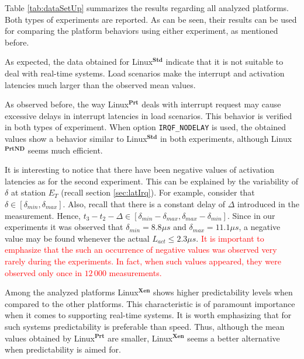 \documentclass{acm_proc_article-sp}
\newcommand{\col}[1]{\textcolor{red}{#1}}
\newcommand{\cod}[1]{\hspace{0.1cm}\texttt{#1}}
\begin{document}
Table \ref{tab:dataSetUp} summarizes the results regarding all analyzed platforms.
Both types of experiments are reported. As can be seen, their results can be used
for comparing the platform behaviors using either experiment, as mentioned before.

As expected, the data obtained for Linux$^\mathbf{Std}$ indicate that it is not
suitable to deal with real-time systems. Load scenarios make the interrupt and
activation latencies much larger than the observed mean values.

As observed before, the way Linux$^\mathbf{Prt}$ deals with interrupt request may
cause excessive delays in interrupt latencies in load scenarios. This behavior is
verified in both types of experiment. When option \cod{IRQF\_NODELAY} is used, the
obtained values show a behavior similar to Linux$^\mathbf{Std}$ in both experiments,
although Linux$^\mathbf{PrtND}$ seems much efficient.

It is interesting to notice that there have been negative values of activation
latencies as for the second experiment.  This can be explained by the variability of
$\delta$ at station $E_T$ (recall section \ref{sec:latIrq}).  For example, consider
that $\delta \in [\delta_{min},\delta_{max}]$. Also, recall that there is a constant
delay of $\Delta$ introduced in the measurement. Hence, $t_3 - t_2 - \Delta \in
[\delta_{min}-\delta_{max},\delta_{max}-\delta_{min}]$. Since in our experiments it
was observed that $\delta_{min} = 8.8 \mu s$ and $\delta_{max} = 11.1 \mu s$, a
negative value may be found whenever the actual $L_{act} \leq 2.3 \mu s$. \col{It is
important to emphasize that the such an occurrence of negative values was observed
very rarely during the experiments. In fact, when such values appeared, they were
observed only once in $12\,000$ measurements.}

Among the analyzed platforms Linux$^\mathbf{Xen}$ shows higher predictability levels
when compared to the other platforms. This characteristic is of paramount importance
when it comes to sup\-porting real-time systems.  It is worth emphasizing that for
such systems predictability is preferable than speed. Thus, although the mean values
obtained by Linux$^\mathbf{Prt}$ are smaller, Linux$^\mathbf{Xen}$ seems a better
alternative when predic\-tability is aimed for.
\end{document}
